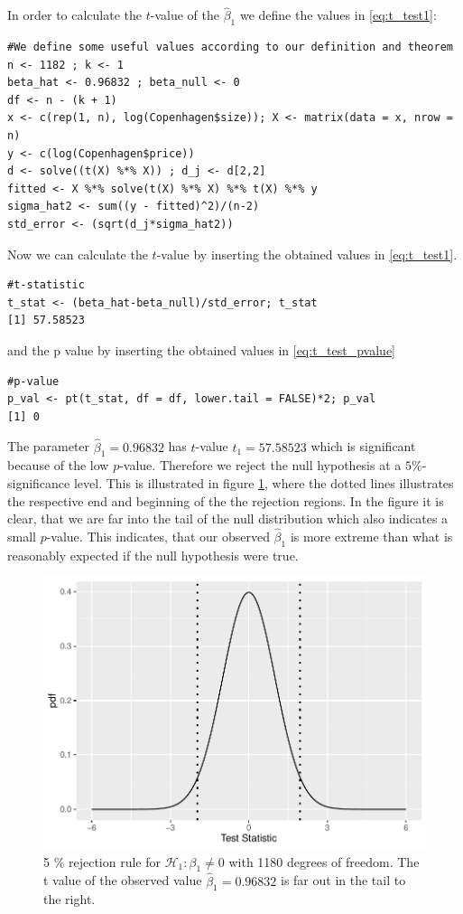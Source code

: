In order to calculate the $t$-value of the $\hat{\beta}_1$ we define the values in \eqref{eq:t_test1}:
\begin{lstlisting}
#We define some useful values according to our definition and theorem
n <- 1182 ; k <- 1
beta_hat <- 0.96832 ; beta_null <- 0
df <- n - (k + 1)
x <- c(rep(1, n), log(Copenhagen$size)); X <- matrix(data = x, nrow = n)
y <- c(log(Copenhagen$price))
d <- solve((t(X) %*% X)) ; d_j <- d[2,2]
fitted <- X %*% solve(t(X) %*% X) %*% t(X) %*% y
sigma_hat2 <- sum((y - fitted)^2)/(n-2)
std_error <- (sqrt(d_j*sigma_hat2))
\end{lstlisting}
Now we can calculate the $t$-value by inserting the obtained values in \eqref{eq:t_test1}.
\begin{lstlisting}
#t-statistic
t_stat <- (beta_hat-beta_null)/std_error; t_stat
[1] 57.58523
\end{lstlisting}
and the p value by inserting the obtained values in \eqref{eq:t_test_pvalue}
\begin{lstlisting}
#p-value
p_val <- pt(t_stat, df = df, lower.tail = FALSE)*2; p_val
[1] 0
\end{lstlisting}
The parameter $\hat{\beta}_1=0.96832$ has $t$-value $t_1 = 57.58523$ which is significant because of the low $p$-value. 
Therefore we reject the null hypothesis at a $5\%$-significance level. 
This is illustrated in figure \ref{fig:t_distributionplot1}, where the dotted lines illustrates the respective end and beginning of the the rejection regions.
In the figure it is clear, that we are far into the tail of the null distribution which also indicates a small $p$-value. 
This indicates, that our observed $\hat{\beta}_1$ is more extreme than what is reasonably expected if the null hypothesis were true.
\begin{figure}[H]
    \centering
    \includegraphics[width = 0.6  \textwidth]{figures/Nanna/t_distribution123.pdf}
    \caption{5 \% rejection rule for $\mathcal{H}_1:\beta_1\neq0$ with 1180 degrees of freedom. The t value of the observed value $\hat{\beta}_1=0.96832$ is far out in the tail to the right.}
    \label{fig:t_distributionplot1}
\end{figure}
